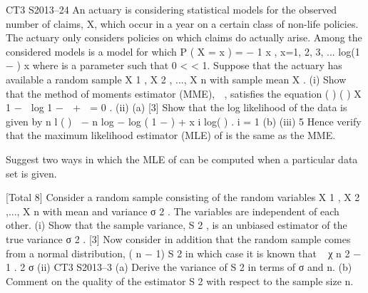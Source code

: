 \documentclass[a4paper,12pt]{article}
\begin{document}
\begin{enumerate}


CT3 S2013–24
An actuary is considering statistical models for the observed number of claims, X,
which occur in a year on a certain class of non-life policies. The actuary only
considers policies on which claims do actually arise. Among the considered models is
a model for which
P ( X = x ) = −
1
\theta x
, x=1, 2, 3, ...
log(1 − \theta ) x
where \theta is a parameter such that 0 < \theta < 1.
Suppose that the actuary has available a random sample X 1 , X 2 , ..., X n with sample
mean X .
(i)
Show that the method of moments estimator (MME),  \theta , satisfies the equation
(
) (
)
X 1 −  \theta log 1 −  \theta +  \theta = 0 .
(ii)
(a)
[3]
Show that the log likelihood of the data is given by
n
l ( \theta ) ∝ − n log { − log ( 1 − \theta ) } + \sum  x i log( \theta ) .
i = 1
(b)
(iii)
5
Hence verify that the maximum likelihood estimator (MLE) of \theta is the
same as the MME.

Suggest two ways in which the MLE of \theta can be computed when a particular
data set is given.

[Total 8]
Consider a random sample consisting of the random variables X 1 , X 2 ,..., X n with
mean \mu  and variance σ 2 . The variables are independent of each other.
(i)
Show that the sample variance, S 2 , is an unbiased estimator of the true
variance σ 2 .
[3]
Now consider in addition that the random sample comes from a normal distribution,
( n − 1) S 2
in which case it is known that
~ χ n 2 − 1 .
2
σ
(ii)
CT3 S2013–3
(a) Derive the variance of S 2 in terms of σ and n.
(b) Comment on the quality of the estimator S 2 with respect to the sample
size n.


\end{enumerate}
\end{document}
